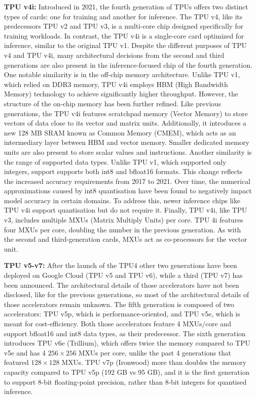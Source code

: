 \textbf{TPU v4i:} Introduced in 2021, the fourth generation of TPUs \cite{Jouppi2021} offers two distinct types of cards: one for training and another for inference. The TPU v4, like its predecessors TPU v2 and TPU v3, is a multi-core chip designed specifically for training workloads. In contrast, the TPU v4i is a single-core card optimized for inference, similar to the original TPU v1.
Despite the different purposes of TPU v4 and TPU v4i, many architectural decisions from the second and third generations are also present in the inference-focused chip of the fourth generation. One notable similarity is in the off-chip memory architecture. Unlike TPU v1, which relied on DDR3 memory, TPU v4i employs HBM (High Bandwidth Memory) technology to achieve significantly higher throughput. However, the structure of the on-chip memory has been further refined. Like previous generations, the TPU v4i features scratchpad memory (Vector Memory) to store vectors of data close to its vector and matrix units. Additionally, it introduces a new 128 MB SRAM known as Common Memory (CMEM), which acts as an intermediary layer between HBM and vector memory. Smaller dedicated memory units are also present to store scalar values and instructions.
Another similarity is the range of supported data types. Unlike TPU v1, which supported only integers, support supports both int8 and bfloat16 formats. This change reflects the increased accuracy requirements from 2017 to 2021. Over time, the numerical approximations caused by int8 quantisation have been found to negatively impact model accuracy in certain domains. To address this, newer inference chips like TPU v4i support quantisation but do not require it. \cite{Jouppi2021}
Finally, TPU v4i, like TPU v3, includes multiple MXUs (Matrix Multiply Units) per core. TPU  4i features four MXUs per core, doubling the number in the previous generation. As with the second and third-generation cards, MXUs act as co-processors for the vector unit.

\textbf{TPU v5-v7:} After the launch of the TPU4 other two generations have been deployed on Google Cloud (TPU v5 and TPU v6), while a third (TPU v7) has been announced. The architectural details of those accelerators have not been disclosed, like for the previous generations, so most of the architectural details of those accelerators remain unknown.
The fifth generation is composed of two accelerators: TPU v5p, which is performance-oriented, and TPU v5e, which is meant for cost-efficiency. Both those accelerators feature 4 MXUs/core and support bfloat16 and int8 data types, as their predecessor.
The sixth generation introduces TPU v6e (Trillium), which offers twice the memory compared to TPU v5e and has 4 $256\times256$ MXUs per core, unlike the past 4 generations that featured $128\times128$ MXUs. TPU v7p (Ironwood) more than doubles the memory capacity compared to TPU v5p (192 GB vs 95 GB), and it is the first generation to support 8-bit floating-point precision, rather than 8-bit integers for quantised inference.

